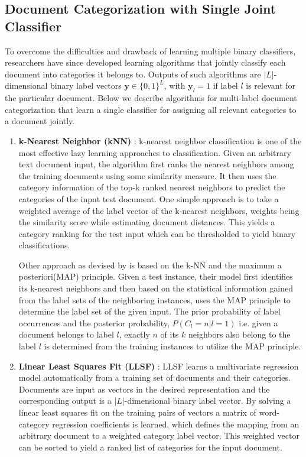\subsection{Document Categorization with Single Joint Classifier}
To overcome the difficulties and drawback of learning multiple binary classifiers, researchers have since developed learning algorithms that jointly classify each document into categories it belongs to. Outputs of such algorithms are $|L|$-dimensional binary label vectors $\boldsymbol{y} \in \{0, 1\}^{L}$, with $\boldsymbol{y}_{l} = 1$ if label $l$ is relevant for the particular document. Below we describe algorithms for multi-label document categorization that learn a single classifier for assigning all relevant categories to a document jointly.
\begin{enumerate}
\item{\textbf{k-Nearest Neighbor (kNN)} : }k-nearest neighbor classification is one of the most effective lazy learning approaches to classification. Given an arbitrary text document input, the algorithm first ranks the nearest neighbors among the training documents using some similarity measure. It then uses the category information of the top-k ranked nearest neighbors to predict the categories of the input test document. One simple approach is to take a weighted average of the label vector of the k-nearest neighbors, weights being the similarity score while estimating document distances. This yields a category ranking for the test input which can be thresholded to yield binary classifications.

Other approach as devised by \cite{zhang2007ml} is based on the k-NN and the maximum a posteriori(MAP) principle. Given a test instance, their model first identifies its k-nearest neighbors and then based on the statistical information gained from the label sets of the neighboring instances, uses the MAP principle to determine the label set of the given input. The prior probability of label occurrences and the posterior probability, $P(C_{l}=n | l=1)$ i.e. given a document belongs to label $l$, exactly $n$ of its $k$ neighbors also belong to the label $l$ is determined from the training instances to utilize the MAP principle.

\item{\textbf{Linear Least Squares Fit (LLSF)} : }LLSF\citep{yang1992linear} learns a multivariate regression model automatically from a training set of documents and their categories. Documents are input as vectors in the desired representation and the corresponding output is a $|L|$-dimensional binary label vector. By solving a linear least squares fit on the training pairs of vectors a matrix of word-category regression coefficients is learned, which defines the mapping from an arbitrary document to a weighted category label vector. This weighted vector can be sorted to yield a ranked list of categories for the input document.


\end{enumerate}
